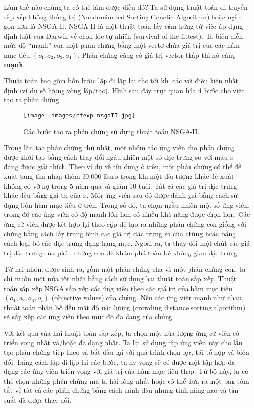 Làm thế nào chúng ta có thể làm được điều đó? Ta sử dụng thuật toán di truyền sắp xếp không thống trị (Nondominated Sorting Genetic Algorithm) hoặc ngắn gọn hơn là NSGA-II. NSGA-II là một thuật toán lấy cảm hứng từ việc áp dụng định luật của Darwin về chọn lọc tự nhiên (survival of the fittest). Ta biểu diễn  mức độ ``mạnh'' của một phản chứng bằng một vectơ chứa giá trị của các hàm mục tiêu $(o_1,o_2,o_3,o_4)$. Phản chứng càng có giá trị vector thấp thì nó càng \textbf{mạnh}.

Thuật toán bao gồm bốn bước lặp đi lặp lại cho tới khi các với điều kiện nhất định (ví dụ số lượng vòng lặp/tạo). Hình sau đây trực quan hóa 4 bước cho việc tạo ra phản chứng. 

\begin{figure*}[h!]
	\centering
	\texttt{[image: images/cfexp-nsgaII.jpg]}
	\label{fig:6_2}
	\caption{Các bước tạo ra phản chứng sử dụng thuật toán NSGA-II.}
\end{figure*}

Trong lần tạo phản chứng thứ nhất, một nhóm các ứng viên cho phản chứng được khởi tạo bằng cách thay đổi ngẫu nhiên một số đặc trưng so với mẫu $x$ đang được giải thích. Theo ví dụ về tín dụng ở trên, một phản chứng có thể đề xuất tăng thu nhập thêm 30.000 Euro trong khi một đối tượng khác đề xuất không có vỡ nợ trong 5 năm qua và giảm 10 tuổi. Tất cả các giá trị đặc trưng khác đều bằng giá trị của $x$. Mỗi ứng viên sau đó được đánh giá bằng cách sử dụng bốn hàm mục tiêu ở trên. Trong số đó, ta chọn ngẫu nhiên một số ứng viên, trong đó các ứng viên có độ mạnh lớn hơn có nhiều khả năng được chọn hơn. Các ứng cử viên được kết hợp lại theo cặp để tạo ra những phản chứng con giống với chúng bằng cách lấy trung bình các giá trị đặc trưng số của chúng hoặc bằng cách loại bỏ các đặc trưng dạng hạng mục. Ngoài ra, ta thay đổi một chút các giá trị đặc trưng của phản chứng con để khám phá toàn bộ không gian đặc trưng.

Từ hai nhóm được sinh ra, gồm một phản chứng cha và một phản chứng con, ta chỉ muốn một nửa tốt nhất bằng cách sử dụng hai thuật toán sắp xếp. Thuật toán sắp xếp NSGA sắp xếp các ứng viên theo các giá trị của hàm mục tiêu $(o_1,o_2,o_3,o_4)$ (objective values) của chúng. Nếu các ứng viên mạnh như nhau, thuật toán phân bố đều mật độ ước lượng (crowding distance sorting algorithm) sẽ sắp xếp các ứng viên theo mức độ đa dạng của chúng.

Với kết quả của hai thuật toán sắp xếp, ta chọn một nửa lượng ứng cử viên có triển vọng nhất và/hoặc đa dạng nhất. Ta lại sử dụng tập ứng viên này cho lần tạo phản chứng tiếp theo và bắt đầu lại với quá trình chọn lọc, tái tổ hợp và biến đổi. Bằng cách lặp đi lặp lại các bước, ta hy vọng sẽ có được một tập hợp đa dạng các ứng viên triển vọng với giá trị của hàm mục tiêu thấp. Từ bộ này, ta có thể chọn những phản chứng mà ta hài lòng nhất hoặc có thể đưa ra một bản tóm tắt về tất cả các phản chứng bằng cách đánh dấu những tính năng nào và tần suất đã được thay đổi.

